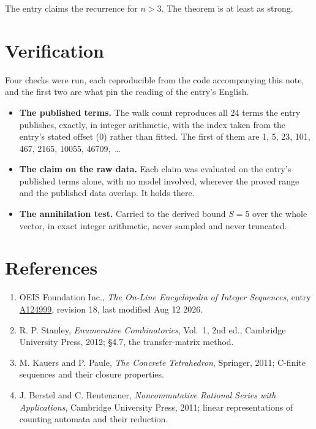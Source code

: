 \documentclass[11pt]{article}
\theoremstyle{definition}
\begin{document}
The entry claims the recurrence for $n > 3$. The theorem is at least as strong.

\section{Verification}

Four checks were run, each reproducible from the code accompanying this note, and the first two are what pin the reading of the entry's English.

\begin{itemize}

\item {\bfseries The published terms.} The walk count reproduces all 24 terms the entry publishes, exactly, in integer arithmetic, with the index taken from the entry's stated offset (0) rather than fitted. The first of them are 1, 5, 23, 101, 467, 2165, 10055, 46709,~\dots

\item {\bfseries The claim on the raw data.} Each claim was evaluated on the entry's published terms alone, with no model involved, wherever the proved range and the published data overlap. It holds there.

\item {\bfseries The annihilation test.} Carried to the derived bound $S = 5$ over the whole vector, in exact integer arithmetic, never sampled and never truncated.

\end{itemize}

\section{References}

\begin{enumerate}

\item OEIS Foundation Inc., \emph{The On-Line Encyclopedia of Integer Sequences}, entry \href{https://oeis.org/A124999}{A124999}, revision 18, last modified Aug 12 2026.

\item R. P. Stanley, \emph{Enumerative Combinatorics}, Vol.~1, 2nd ed., Cambridge University Press, 2012; \S4.7, the transfer-matrix method.

\item M. Kauers and P. Paule, \emph{The Concrete Tetrahedron}, Springer, 2011; C-finite sequences and their closure properties.

\item J. Berstel and C. Reutenauer, \emph{Noncommutative Rational Series with Applications}, Cambridge University Press, 2011; linear representations of counting automata and their reduction.

\end{enumerate}
\end{document}
